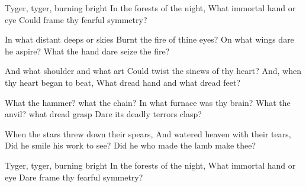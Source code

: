 
\begin{poem}

\begin{stanza}
Tyger, tyger, burning bright\verseline
In the forests of the night,\verseline
What immortal hand or eye\verseline
Could frame thy fearful symmetry?
\end{stanza}
\begin{stanza}
\verseindent In what distant deeps or skies\verseline
Burnt the fire of thine eyes?\verseline
On what wings dare he aspire?\verseline
What the hand dare seize the fire?
\end{stanza}
\begin{stanza}
\verseindent And what shoulder and what art\verseline
Could twist the sinews of thy heart?\verseline
And, when thy heart began to beat,\verseline
What dread hand and what dread feet?
\end{stanza}
\begin{stanza}
\verseindent What the hammer? what the chain?\verseline
In what furnace was thy brain?\verseline
What the anvil? what dread grasp\verseline
Dare its deadly terrors clasp?
\end{stanza}
\begin{stanza}
\verseindent When the stars threw down their spears,\verseline
And watered heaven with their tears,\verseline
Did he smile his work to see?\verseline
Did he who made the lamb make thee?
\end{stanza}
\begin{stanza}
\verseindent Tyger, tyger, burning bright\verseline
In the forests of the night,\verseline
What immortal hand or eye\verseline
Dare frame thy fearful symmetry?
\end{stanza}

\end{poem}